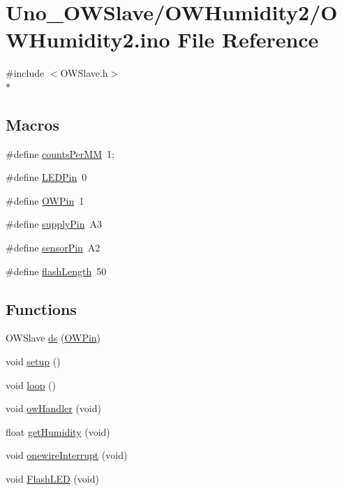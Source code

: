 \hypertarget{OWHumidity2_8ino}{\section{Uno\-\_\-\-O\-W\-Slave/\-O\-W\-Humidity2/\-O\-W\-Humidity2.ino File Reference}
\label{OWHumidity2_8ino}
}
{\ttfamily \#include $<$O\-W\-Slave.\-h$>$}\\*
\subsection*{Macros}
\begin{DoxyCompactItemize}
\item 
\#define \hyperlink{OWHumidity2_8ino_a8f0a461ec2c621e04db91f4970f2f1d5}{counts\-Per\-M\-M}~1;
\item 
\#define \hyperlink{OWHumidity2_8ino_abd966e26c1237652c6c1dc46a8f14203}{L\-E\-D\-Pin}~0
\item 
\#define \hyperlink{OWHumidity2_8ino_a7f5aa1ac0711ae18877a165a9bf24625}{O\-W\-Pin}~1
\item 
\#define \hyperlink{OWHumidity2_8ino_a07f3f43bced0769a33eea6ae5cc79d09}{supply\-Pin}~A3
\item 
\#define \hyperlink{OWHumidity2_8ino_a6c53d6a30fb5dab269c504c7edc3465e}{sensor\-Pin}~A2
\item 
\#define \hyperlink{OWHumidity2_8ino_a65b6f41e12d2d8bdbd3416c8db11770e}{flash\-Length}~50
\end{DoxyCompactItemize}
\subsection*{Functions}
\begin{DoxyCompactItemize}
\item 
O\-W\-Slave \hyperlink{OWHumidity2_8ino_af75456870b9486275b406e13b003fb11}{ds} (\hyperlink{OWRain1_8ino_a7f5aa1ac0711ae18877a165a9bf24625}{O\-W\-Pin})
\item 
void \hyperlink{OWHumidity2_8ino_a4fc01d736fe50cf5b977f755b675f11d}{setup} ()
\item 
void \hyperlink{OWHumidity2_8ino_afe461d27b9c48d5921c00d521181f12f}{loop} ()
\item 
void \hyperlink{OWHumidity2_8ino_a643d85ad86e66d0d2e01c6221fc1ed68}{ow\-Handler} (void)
\item 
float \hyperlink{OWHumidity2_8ino_ad4c6124c34ae019b1d43e418e09d95d5}{get\-Humidity} (void)
\item 
void \hyperlink{OWHumidity2_8ino_a88a9a9fb27383ed7c6a52946a7b7e9a6}{onewire\-Interrupt} (void)
\item 
void \hyperlink{OWHumidity2_8ino_a01a172314339d22fc02b43fb765e0d76}{Flash\-L\-E\-D} (void)
\end{DoxyCompactItemize}
